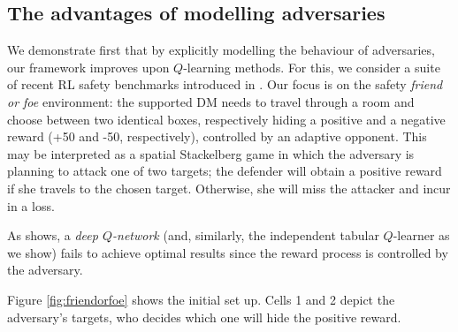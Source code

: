 

\subsection{The advantages of modelling adversaries}\label{s:sg}

We demonstrate first that  by
explicitly modelling the behaviour of adversaries, 
our framework improves upon $Q$-learning methods. 
For this, we consider a suite of recent RL safety benchmarks
 introduced in \parencite{leike2017ai}.
Our focus is 
on the safety \emph{friend or foe} environment:
the supported DM
needs to travel through a room and choose 
between two identical boxes, respectively hiding a positive
and a negative reward (+50 and -50, respectively), controlled by
an adaptive opponent.
This may be interpreted as a spatial Stackelberg game in which
the adversary is planning to attack one of two targets; the defender
will obtain a positive reward if she travels to the chosen target. Otherwise,
she will miss the attacker and incur in a loss.

As \parencite{leike2017ai} shows, a \emph{deep $Q$-network}
(and, similarly, the independent tabular $Q$-learner as we show) fails to
achieve optimal results since the reward process is controlled by the adversary.

Figure \ref{fig:friendorfoe} shows the initial set up. 
Cells 1 and 2 depict the adversary's targets, who decides which 
one will 
hide the positive reward.

